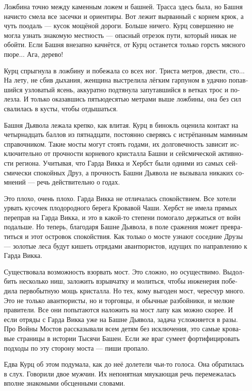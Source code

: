 \documentclass[a4paper,12pt,fleqn]{book}\usepackage{cooltooltips}\usepackage{polyglossia}\setdefaultlanguage[babelshorthands=true]{russian}\setotherlanguage{english}\defaultfontfeatures{Ligatures=TeX,Mapping=tex-text} \usepackage{xcolor}\definecolor{lightgray}{HTML}{bbbbbb}\color{lightgray}\newcommand{\ml}[3]{\textenglish{\textcolor{black}{#3}}}
\begin{document}
Ложбина точно между каменным ложем и башней.
Трасса здесь была, но Башня начисто смела все засечки и ориентиры.
Вот лежит вырванный с корнем крюк, а чуть поодаль --- кусок мощёной дороги.
Больше ничего.
Курц совершенно не могла узнать знакомую местность --- опасный отрезок пути, который никак не обойти.
Если Башня внезапно качнётся, от Курц останется только горсть мясного пюре...
Ага, дерево!

Курц спрыгнула в ложбину и побежала со всех ног.
Триста метров, двести, сто...
На лету, не сбив дыхания, женщина выстрелила лёгким гарпуном в удачно попавшийся узловатый ясень, аккуратно подтянула запутавшийся в ветках трос и полезла.
И только оказавшись пятьюдесятью метрами выше ложбины, она без сил свалилась в кусты, чтобы отдышаться.

Башня Дьявола лежала крепко, как влитая.
Курц в бинокль оценила контакт на четырнадцать баллов из пятнадцати, постоянно сверяясь с истрёпанным маминым справочником.
Такие мосты могут стоять годами, их долговечность зависит исключительно от прочности корневого кристалла Башни и сейсмической активности региона.
Учитывая, что Гарда Викка и Хербст были одними из самых сейсмически спокойных Друз, а прочность Башни Дьявола не вызывала никаких сомнений --- речь действительно о годах.

Это плохо, очень плохо.
Гарда Викка не отличалась спокойствием.
Все хотели урвать кусочек плодородного берега Кровавой Чаши.
Хербст не имела прямых переправ на Гарда Викка, и это в какой-то степени помогало держаться от войн подальше.
Но теперь, благодаря Башне Дьявола, в поле сражения может превратиться и этот островок спокойствия.
Как только о мосте узнают соседние Друзы --- золотые леса будут кишеть отрядами авантюристов, идущих по направлению к Гарда Викка.

Существовала возможность взорвать мост.
Это сложно, но осуществимо.
Выдолбить несколько ниш, заложить взрывчатку и молиться, чтобы инженерия победила первобытную мощь кристалла.
Но тех, кому выгоден мост, чересчур много.
Это не только авантюристы, но и торговцы, и обычные разбойники, и мелкие правители.
Все они попытаются наложить на мост лапу как можно скорее.
И если отряды с Гарда Викка уже на Башне Дьявола, задача усложняется в разы.
Про Войны Мостов рассказывали всем детям без исключения, это самые кровавые страницы в истории Тысячи Башен.
Если же враг сумеет фортифицировать подходы по эту сторону моста --- пиши пропало.

Едва Курц об этом подумала, как до неё долетели чьи-то голоса.
Она обратилась в слух.
Говорили двое мужчин.
Их непонятная мяукающая речь перемежалась вполне знакомыми обсценными словами.
\end{document}
